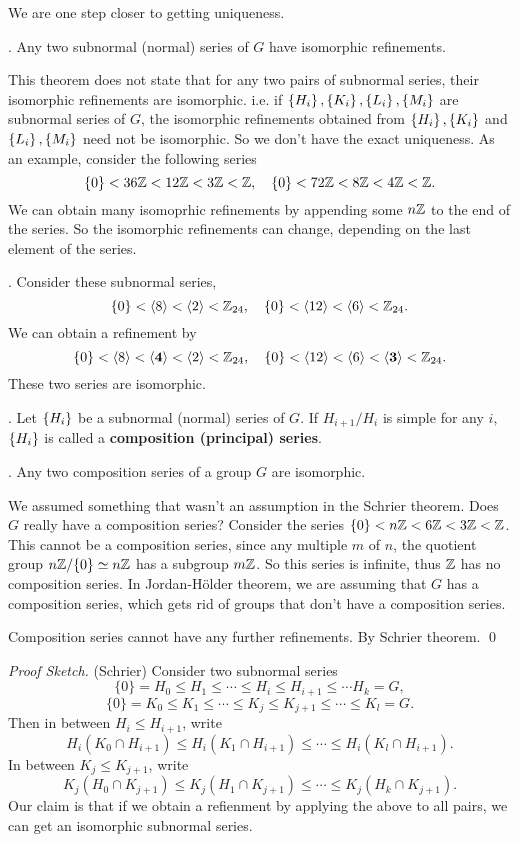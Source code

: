 We are one step closer to getting uniqueness.

\thm.  Any two subnormal (normal) series of \(G\) have isomorphic refinements.

\rmk This theorem does not state that for any two pairs of subnormal series, their isomorphic refinements are isomorphic. i.e. if \(\left\{ H_i \right\}, \left\{ K_i \right\}, \left\{ L_i \right\}, \left\{ M_i \right\}\) are subnormal series of \(G\), the isomorphic refinements obtained from \(\left\{ H_i \right\}, \left\{ K_i \right\}\) and \(\left\{ L_i \right\}, \left\{ M_i \right\}\) need not be isomorphic. So we don't have the exact uniqueness. As an example, consider the following series
\[
    \{0\} < 36\mathbb{Z} < 12\mathbb{Z} < 3\mathbb{Z} < \mathbb{Z}, \quad \{0\} < 72\mathbb{Z} < 8\mathbb{Z} < 4\mathbb{Z} < \mathbb{Z}.
\]
We can obtain many isomoprhic refinements by appending some \(n\mathbb{Z}\) to the end of the series. So the isomorphic refinements can change, depending on the last element of the series.

\ex. Consider these subnormal series,
\[
    \{0\} < \left\langle 8 \right\rangle < \left\langle 2 \right\rangle < \mathbb{Z}_{24}, \quad \{0\} < \left\langle 12 \right\rangle < \left\langle 6 \right\rangle < \mathbb{Z}_{24}.
\]
We can obtain a refinement by
\[
    \{0\} < \left\langle 8 \right\rangle < \mathbf{\left\langle 4 \right\rangle} < \left\langle 2 \right\rangle < \mathbb{Z}_{24}, \quad \{0\} < \left\langle 12 \right\rangle < \left\langle 6 \right\rangle < \mathbf{\left\langle 3 \right\rangle} < \mathbb{Z}_{24}.
\]
These two series are isomorphic.

. Let \(\left\{ H_i \right\}\) be a subnormal (normal) series of \(G\). If \(H_{i+1} / H_i\) is simple for any \(i\), \(\left\{ H_i \right\}\) is called a \textbf{composition (principal) series}.

\thm.  Any two composition series of a group \(G\) are isomorphic.

\rmk We assumed something that wasn't an assumption in the Schrier theorem. Does \(G\) really have a composition series? Consider the series \(\{0\} < n\mathbb{Z} < 6\mathbb{Z} < 3\mathbb{Z} < \mathbb{Z}\). This cannot be a composition series, since any multiple \(m\) of \(n\), the quotient group \(n\mathbb{Z} / \{0\} \simeq n\mathbb{Z}\) has a subgroup \(m\mathbb{Z}\). So this series is infinite, thus \(\mathbb{Z}\) has no composition series. In Jordan-Hölder theorem, we are assuming that \(G\) has a composition series, which gets rid of groups that don't have a composition series.

\pf Composition series cannot have any further refinements. By Schrier theorem. \qed

\medskip

\textit{Proof Sketch.} (Schrier) Consider two subnormal series
\[
    \{0\} = H_0 \leq H_1 \leq \cdots \leq H_i \leq H_{i+1} \leq \cdots H_k = G,
\]
\[
    \{0\} = K_0 \leq K_1 \leq \cdots \leq K_j \leq K_{j+1} \leq \cdots \leq K_l = G.
\]
Then in between \(H_i \leq H_{i+1}\), write
\[
    H_i(K_0 \cap H_{i+1}) \leq H_i(K_1 \cap H_{i+1}) \leq \cdots \leq H_i(K_l \cap H_{i+1}).
\]
In between \(K_j \leq K_{j+1}\), write
\[
    K_j (H_0 \cap K_{j+1}) \leq K_j (H_1 \cap K_{j+1}) \leq \cdots \leq K_j (H_k \cap K_{j+1}).
\]
Our claim is that if we obtain a refienment by applying the above to all pairs, we can get an isomorphic subnormal series.

